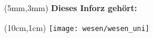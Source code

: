 \thispagestyle{empty}

\begin{textblock*}{10cm}(5mm,3mm)
    \normalsize \textbf{Dieses Inforz gehört:}
\end{textblock*}

\begin{textblock*}{4cm}(10cm,1cm)
    \texttt{[image: wesen/wesen\_uni]}
\end{textblock*}
